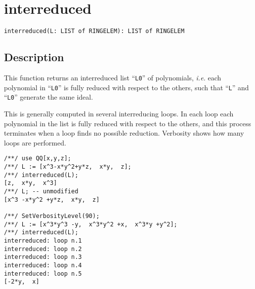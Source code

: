 \documentclass[a4paper]{mybook}
\newenvironment{command}{}{} %
\begin{document}
\section{interreduced}
\label{interreduced}
\begin{command} %


\begin{Verbatim}[label=syntax, rulecolor=\color{MidnightBlue},
frame=single]
interreduced(L: LIST of RINGELEM): LIST of RINGELEM
\end{Verbatim}


\subsection*{Description}

This function returns an interreduced list ``\verb&L0&'' of polynomials,
\textit{i.e.} each polynomial in ``\verb&L0&'' is fully reduced with respect to the others,
such that ``\verb&L&'' and ``\verb&L0&'' generate the same ideal.
\par 
This is generally computed in several interreducing loops.
In each loop each polynomial in the list is fully reduced with respect
to the others, and this process terminates when a loop finds no
possible reduction.
Verbosity shows how many loops are performed.
\begin{Verbatim}[label=example, rulecolor=\color{PineGreen}, frame=single]
/**/ use QQ[x,y,z];
/**/ L := [x^3-x*y^2+y*z,  x*y,  z];
/**/ interreduced(L);
[z,  x*y,  x^3]
/**/ L; -- unmodified
[x^3 -x*y^2 +y*z,  x*y,  z]

/**/ SetVerbosityLevel(90);
/**/ L := [x^3*y^3 -y,  x^3*y^2 +x,  x^3*y +y^2];
/**/ interreduced(L);
interreduced: loop n.1
interreduced: loop n.2
interreduced: loop n.3
interreduced: loop n.4
interreduced: loop n.5
[-2*y,  x]
\end{Verbatim}


\end{command} %
\end{document}
